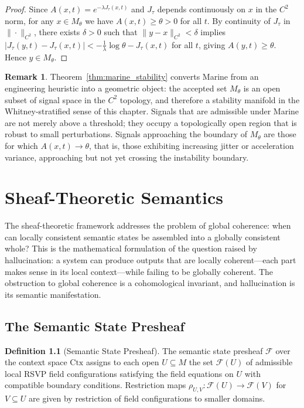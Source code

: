 \documentclass[12pt, oneside]{book}
\theoremstyle{flyxion}
\theoremstyle{definition}
\newtheorem{definition}[theorem]{Definition}
\newtheorem{remark}[theorem]{Remark}
\begin{document}
\begin{proof}
Since $A(x,t) = e^{-\lambda J_\tau(x,t)}$ and $J_\tau$
depends continuously on $x$ in the $C^2$ norm, for any
$x \in M_\theta$ we have $A(x,t) \geq \theta > 0$ for
all $t$. By continuity of $J_\tau$ in $\|\cdot\|_{C^2}$,
there exists $\delta > 0$ such that $\|y - x\|_{C^2} <
\delta$ implies $|J_\tau(y,t) - J_\tau(x,t)| <
-\frac{1}{\lambda}\log\theta - J_\tau(x,t)$ for all $t$,
giving $A(y,t) \geq \theta$. Hence $y \in M_\theta$.
\end{proof}

\begin{remark}
Theorem~\ref{thm:marine_stability} converts Marine from an
engineering heuristic into a geometric object: the accepted
set $M_\theta$ is an open subset of signal space in the
$C^2$ topology, and therefore a stability manifold in the
Whitney-stratified sense of this chapter. Signals that are
admissible under Marine are not merely above a threshold;
they occupy a topologically open region that is robust to
small perturbations. Signals approaching the boundary of
$M_\theta$ are those for which $A(x,t) \to \theta$, that
is, those exhibiting increasing jitter or acceleration
variance, approaching but not yet crossing the instability
boundary.
\end{remark}

\chapter{Sheaf-Theoretic Semantics}

The sheaf-theoretic framework addresses the problem of
global coherence: when can locally consistent semantic
states be assembled into a globally consistent whole?
This is the mathematical formulation of the question
raised by hallucination: a system can produce outputs
that are locally coherent---each part makes sense in its
local context---while failing to be globally coherent.
The obstruction to global coherence is a cohomological
invariant, and hallucination is its semantic manifestation.

\section{The Semantic State Presheaf}

\begin{definition}[Semantic State Presheaf]
The semantic state presheaf $\mathcal{F}$ over the
context space $\mathrm{Ctx}$ assigns to each open
$U \subseteq M$ the set $\mathcal{F}(U)$ of admissible
local RSVP field configurations satisfying the field
equations on $U$ with compatible boundary conditions.
Restriction maps $\rho_{U,V} : \mathcal{F}(U) \to
\mathcal{F}(V)$ for $V \subseteq U$ are given by
restriction of field configurations to smaller domains.
\end{definition}
\end{document}
